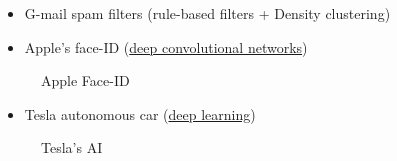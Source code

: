 \documentclass[
  paper=6in:9in,
  pagesize=pdftex,
  headinclude=on,
  footinclude=on,
  12pt]{scrbook}
\providecommand{\tightlist}{%
  \setlength{\itemsep}{0pt}\setlength{\parskip}{0pt}}\usepackage{longtable,booktabs,array}
\begin{document}
\begin{itemize}
\tightlist
\item
  G-mail spam filters (rule-based filters + Density clustering)
\item
  Apple's face-ID
  (\href{https://machinelearning.apple.com/research/face-detection}{deep
  convolutional networks})
\end{itemize}

\begin{figure}[H]


\caption{\label{fig-ml-faceid}Apple Face-ID}

\end{figure}%

\begin{itemize}
\tightlist
\item
  Tesla autonomous car
  (\href{https://www.youtube.com/watch?v=j0z4FweCy4M}{deep learning})
\end{itemize}

\begin{figure}[H]


\caption{\label{fig-ml-teslai}Tesla's AI}

\end{figure}%
\end{document}
